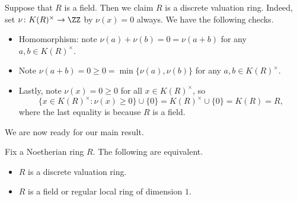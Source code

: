 \begin{example} \label{ex:fieldisdvr}
	Suppose that $R$ is a field. Then we claim $R$ is a discrete valuation ring. Indeed, set $\nu\colon K(R)^\times\to\ZZ$ by $\nu(x)=0$ always. We have the following checks.
	\begin{itemize}
		\item Homomorphism: note $\nu(a)+\nu(b)=0=\nu(a+b)$ for any $a,b\in K(R)^\times$.
		\item Note $\nu(a+b)=0\ge0=\min\{\nu(a),\nu(b)\}$ for any $a,b\in K(R)^\times$.
		\item Lastly, note $\nu(x)=0\ge0$ for all $x\in K(R)^\times$, so
		\[\{x\in K(R)^\times:\nu(x)\ge0\}\cup\{0\}=K(R)^\times\cup\{0\}=K(R)=R,\]
		where the last equality is because $R$ is a field.
	\end{itemize}
\end{example}
We are now ready for our main result.
\begin{proposition} \label{prop:dvrgrabbag}
	Fix a Noetherian ring $R$. The following are equivalent.
	\begin{itemize}
		\item $R$ is a discrete valuation ring.
		\item $R$ is a field or regular local ring of dimension $1$.
	\end{itemize}
\end{proposition}
